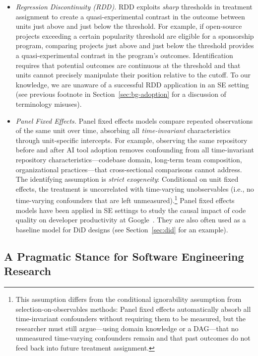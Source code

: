 \begin{itemize}[leftmargin=15pt]
    \item \emph{Regression Discontinuity (RDD).}
    RDD exploits \emph{sharp} thresholds in treatment assignment to create a quasi-experimental contrast in the outcome between units just above and just below the threshold.
    For example, if open-source projects exceeding a certain popularity threshold are eligible for a sponsorship program, comparing projects just above and just below the threshold provides a quasi-experimental contrast in the program's outcomes.
    Identification requires that potential outcomes are continuous at the threshold and that units cannot precisely manipulate their position relative to the cutoff.
    To our knowledge, we are unaware of a successful RDD application in an SE setting (see previous footnote in Section~\ref{sec:bg-adoption} for a discussion of terminology misuses).

    \item \emph{Panel Fixed Effects.}
    Panel fixed effects models compare repeated observations of the same unit over time, absorbing all \emph{time-invariant} characteristics through unit-specific intercepts.
    For example, observing the same repository before and after AI tool adoption removes confounding from all time-invariant repository characteristics---codebase domain, long-term team composition, organizational practices---that cross-sectional comparisons cannot address.
    The identifying assumption is \emph{strict exogeneity}: Conditional on unit fixed effects, the treatment is uncorrelated with time-varying unobservables (i.e., no time-varying confounders that are left unmeasured).\footnote{This assumption differs from the conditional ignorability assumption from selection-on-observables methods: Panel fixed effects automatically absorb all time-invariant confounders without requiring them to be measured, but the researcher must still argue---using domain knowledge or a DAG---that no unmeasured time-varying confounders remain and that past outcomes do not feed back into future treatment assignment.}
    Panel fixed effects models have been applied in SE settings to study the causal impact of code quality on developer productivity at Google~\cite{DBLP:conf/sigsoft/ChengMCJGKZ022}.
    They are also often used as a baseline model for DiD designs (see Section~\ref{sec:did} for an example).
\end{itemize}

\subsection{A Pragmatic Stance for Software Engineering Research}
\label{sec:primer-stance}
\label{sec:guide}

